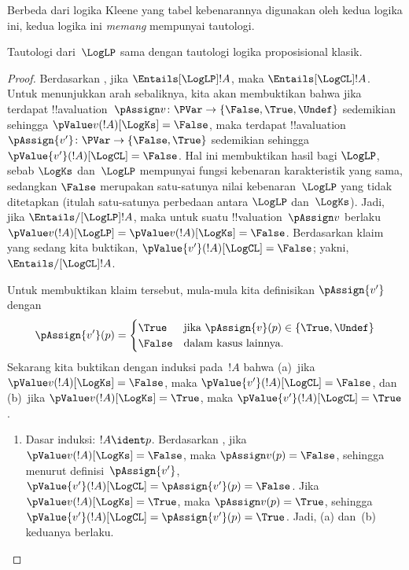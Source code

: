 \documentclass[../../../include/open-logic-section]{subfiles}
\begin{document}
Berbeda dari logika Kleene yang tabel kebenarannya digunakan oleh kedua logika
ini, kedua logika ini \emph{memang} mempunyai tautologi.

\begin{prop} Tautologi dari~$\LogLP$ sama dengan
  tautologi logika proposisional klasik.
\end{prop}

\begin{proof}
  Berdasarkan , jika
  $\Entails[\LogLP]!A$, maka $\Entails[\LogCL]!A$. Untuk menunjukkan arah
  sebaliknya, kita akan membuktikan bahwa jika terdapat
  !!a{valuation}~$\pAssign v\colon\PVar\to\{\False,\True,\Undef\}$
  sedemikian sehingga $\pValue v(!A)[\LogKs]=\False$, maka terdapat
  !!a{valuation}~$\pAssign{v'}\colon\PVar\to\{\False,\True\}$ sedemikian
  sehingga $\pValue{v'}(!A)[\LogCL]=\False$. Hal ini membuktikan hasil bagi
  $\LogLP$, sebab $\LogKs$ dan~$\LogLP$ mempunyai fungsi kebenaran
  karakteristik yang sama, sedangkan $\False$ merupakan satu-satunya nilai
  kebenaran~$\LogLP$ yang tidak ditetapkan (itulah satu-satunya perbedaan
  antara $\LogLP$ dan~$\LogKs$). Jadi, jika
  $\Entails/[\LogLP]!A$, maka untuk suatu !!{valuation}~$\pAssign v$ berlaku
  $\pValue v(!A)[\LogLP]=\pValue v(!A)[\LogKs]=\False$. Berdasarkan klaim
  yang sedang kita buktikan, $\pValue{v'}(!A)[\LogCL]=\False$; yakni,
  $\Entails/[\LogCL]!A$.

  Untuk membuktikan klaim tersebut, mula-mula kita definisikan $\pAssign{v'}$
  dengan
  \[
    \pAssign {v'}(p) =
    \begin{cases}
    \True & \text{jika } \pAssign {v}(p) \in \{\True, \Undef\}\\
    \False & \text{dalam kasus lainnya.}
  \end{cases}
  \]
  Sekarang kita buktikan dengan induksi pada~$!A$ bahwa (a)~jika
  $\pValue v(!A)[\LogKs]=\False$, maka
  $\pValue{v'}(!A)[\LogCL]=\False$, dan (b)~jika
  $\pValue v(!A)[\LogKs]=\True$, maka
  $\pValue{v'}(!A)[\LogCL]=\True$.
  \begin{enumerate}
    \item Dasar induksi: $!A\ident p$. Berdasarkan
    , jika $\pValue v(!A)[\LogKs]=\False$,
    maka $\pAssign v(p)=\False$, sehingga menurut definisi~$\pAssign{v'}$,
    $\pValue{v'}(!A)[\LogCL]=\pAssign{v'}(p)=\False$. Jika
    $\pValue v(!A)[\LogKs]=\True$, maka $\pAssign v(p)=\True$, sehingga
    $\pValue{v'}(!A)[\LogCL]=\pAssign{v'}(p)=\True$. Jadi, (a) dan~(b)
    keduanya berlaku.


\end{enumerate}
\end{proof}
\end{document}
